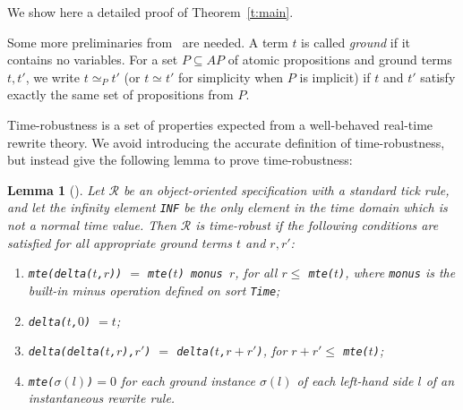 \documentclass[12pt,onecolumn]{IEEEtranTIE}
\newtheorem{lemma}[theorem]{Lemma}
\begin{document}
\label{a:proof}
\setcounter{theorem}{0}
\renewcommand{\thetheorem}{\thesection.\arabic{theorem}}
\newcommand{\lrps}[2]{\rightarrow^{#1}_{#2}}

We show here a detailed proof of Theorem~\ref{t:main}.

Some more preliminaries from~\cite{DBLP:journals/entcs/OlveczkyM07a}
are needed. A term $t$ is called \emph{ground} if it contains no
variables. For a set $P\subseteq AP$ of atomic propositions and ground
terms $t,t'$, we write $t\simeq_P t'$ (or $t\simeq t'$ for simplicity
when $P$ is implicit) if $t$ and $t'$ satisfy exactly the same set of
propositions from $P$.

Time-robustness is a set of properties expected from a well-behaved
real-time rewrite theory. We avoid introducing the accurate definition
of time-robustness, but instead give the following lemma to prove
time-robustness:
\begin{lemma}[\cite{DBLP:journals/entcs/OlveczkyM07a}]
\label{l:timerobustness}
Let $\mathcal{R}$ be an object-oriented specification with a standard
tick rule, and let the infinity element \verb|INF| be the only element
in the time domain which is not a normal time value.  Then
$\mathcal{R}$ is time-robust if the following conditions are satisfied
for all appropriate ground terms $t$ and $r,r'$:
\begin{enumerate}
\item
[(i)] \verb|mte(delta(|$t$\verb|,|$r$\verb|))| $=$
\verb|mte(|$t$\verb|) monus |$r$, for all $r\le$
\verb|mte(|$t$\verb|)|, where \verb|monus| is the built-in minus
operation defined on sort \verb|Time|;

\item
[(ii)] \verb|delta(|$t$\verb|,|$0$\verb|)| $= t$;

\item
[(iii)] \verb|delta(delta(|$t$\verb|,|$r$\verb|),|$r'$\verb|)| $=$
\verb|delta(|$t$\verb|,|$r+r'$\verb|)|, for $r+r'\le$
\verb|mte(|$t$\verb|)|;

\item
[(iv)] \verb|mte(|$\sigma(l)$\verb|)|$= 0$ for each ground instance
$\sigma(l)$ of each left-hand side $l$ of an instantaneous rewrite
rule.
\end{enumerate}
\end{lemma}
\end{document}
